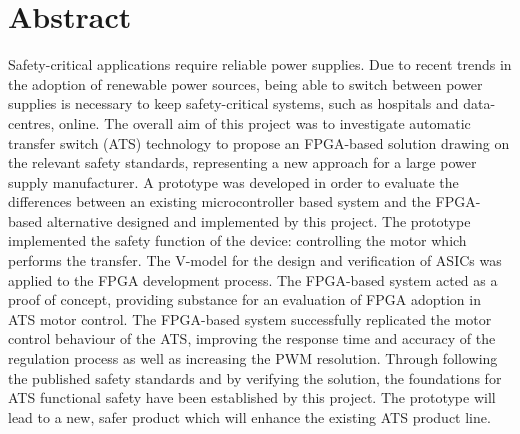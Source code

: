 \chapter{Abstract}
Safety-critical applications require reliable power supplies. Due to recent trends in the adoption of renewable power sources, being able to switch between power supplies is necessary to keep safety-critical systems, such as hospitals and data-centres, online. The overall aim of this project was to investigate automatic transfer switch (ATS) technology to propose an FPGA-based solution drawing on the relevant safety standards, representing a new approach for a large power supply manufacturer. A prototype was developed in order to evaluate the differences between an existing microcontroller based system and the FPGA-based alternative designed and implemented by this project. The prototype implemented the safety function of the device: controlling the motor which performs the transfer. The V-model for the design and verification of ASICs was applied to the FPGA development process. The FPGA-based system acted as a proof of concept, providing substance for an evaluation of FPGA adoption in ATS motor control. The FPGA-based system successfully replicated the motor control behaviour of the ATS, improving the response time and accuracy of the regulation process as well as increasing the PWM resolution. Through following the published safety standards and by verifying the solution, the foundations for ATS functional safety have been established by this project. The prototype will lead to a new, safer product which will enhance the existing ATS product line.